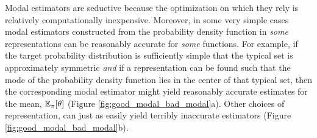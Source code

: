 Modal estimators are seductive because the optimization on which they
rely is relatively computationally inexpensive.  Moreover, in some very 
simple cases modal estimators constructed from the probability density 
function in \emph{some} representations can be reasonably accurate for 
\emph{some} functions.  For example, if the target probability distribution 
is sufficiently simple that the typical set is approximately symmetric 
\emph{and} if a representation can be found such that the mode of the 
probability density function lies in the center of that typical set, then the 
corresponding modal estimator might yield reasonably accurate estimates 
for the mean, $\mathbb{E}_{\pi} \! \left[ \theta \right]$ 
(Figure \ref{fig:good_modal_bad_modal}a).  Other choices of 
representation, can just as easily yield terribly inaccurate estimators
(Figure \ref{fig:good_modal_bad_modal}b).

